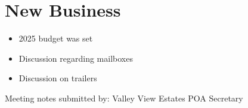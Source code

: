 \documentclass[12pt,a4paper]{article}
\begin{document}
\section*{New Business}
\begin{itemize}
  \item 2025 budget was set
  \item Discussion regarding mailboxes
  \item Discussion on trailers
\end{itemize}

\begin{flushleft}
Meeting notes submitted by:\break{}
\@author\break{}
Valley View Estates POA Secretary
\end{flushleft}
\end{document}
